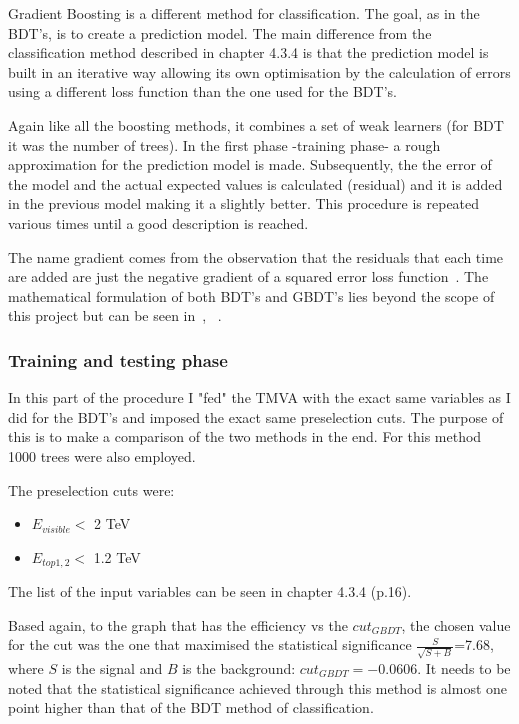 \documentclass[12pt,a4paper]{report}
\begin{document}
Gradient Boosting is a different method for classification. The goal, as in the BDT's, is to create a 
prediction model. The main difference from the classification method described in chapter 4.3.4 is that 
the prediction model is built in an iterative way allowing its own optimisation by the calculation of errors
using a different loss function than the one used for the BDT's.

Again like all the boosting methods, it combines a set of weak learners (for BDT it was the number of trees).
In the first phase -training phase- a rough approximation for the prediction model is made. Subsequently, the 
the error of the model and the actual expected values is calculated (residual) and it is added in the
previous model making it a slightly  better. This procedure is repeated various times until a good description
is reached. 

The name gradient comes from the observation that the residuals that each time are added are just the 
negative gradient of a squared error loss function~\cite{hoecker2007tmva}. The mathematical formulation of 
both BDT's and GBDT's lies beyond the scope of this project but can be seen in~\cite{schapire1999brief},
~\cite{hoecker2007tmva}.


\subsubsection{Training and testing phase}

In this part of the procedure I "fed" the TMVA with the exact same variables as I did for the BDT's and 
imposed the exact same preselection cuts. The purpose of this is to make a comparison of the two methods in 
the end. For this method 1000 trees were also employed.

The preselection cuts were:

\begin{itemize}
 \item $E_{visible} <$ 2 TeV
 \item $E_{top1,2} <$ 1.2 TeV
\end{itemize}

The list of the input variables can be seen in chapter 4.3.4 (p.16).

Based again, to the graph that has the efficiency vs the $cut_{GBDT}$, the chosen value for the cut was the one
that maximised the statistical significance $\frac{S}{\sqrt{S+B}}$=7.68, where $S$ is the signal and $B$ is the 
background: $cut_{GBDT}=-0.0606$. It needs to be noted that the statistical significance achieved through
this method is almost one point higher than that of the BDT method of classification.
\end{document}
